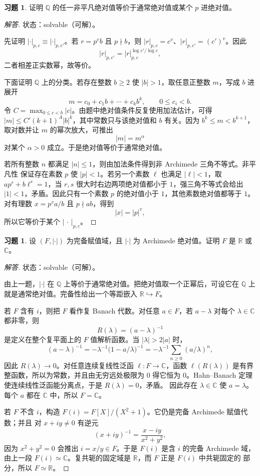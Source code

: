 \documentclass[11pt,a4paper,openany]{ctexbook}
\numberwithin{equation}{chapter}
\newcommand{\Q}{\mathbb{Q}}
\newcommand{\R}{\mathbb{R}}
\newcommand{\C}{\mathbb{C}}
\theoremstyle{plain}
\theoremstyle{definition}
\newtheorem{exercise}[theorem]{习题}
\theoremstyle{remark}
\begin{document}
\begin{exercise}
证明 $\Q$ 的任一非平凡绝对值等价于通常绝对值或某个 $p$ 进绝对值。
\end{exercise}

\begin{proof}[解答]
状态：solvable（可解）。

先证明 $|\cdot|_{p,c}\equiv|\cdot|_{p,c'}$。若 $r=p^vb$ 且 $p\nmid b$，则
$|r|_{p,c}=c^v$、$|r|_{p,c'}=(c')^v$。因此
\[
|r|_{p,c'}=|r|_{p,c}^{\log c'/\log c},
\]
二者相差正实数幂，故等价。

下面证明 $\Q$ 上的分类。若存在整数 $b\ge2$ 使 $|b|>1$，取任意正整数 $m$，写成
$b$ 进展开
\[
m=c_0+c_1b+\cdots+c_kb^k,\qquad 0\le c_i<b.
\]
令 $C=\max_{0\le c<b}|c|$。由题中绝对值条件反复使用加法估计，可得
$|m|\le C'(k+1)^A |b|^k$，其中常数只与该绝对值和 $b$ 有关。因为
$b^k\le m<b^{k+1}$，取对数并让 $m$ 的幂次放大，可推出
\[
|m|=m^\alpha
\]
对某个 $\alpha>0$ 成立。于是绝对值等价于通常绝对值。

若所有整数 $n$ 都满足 $|n|\le1$，则由加法条件得到非 Archimede 三角不等式。非平凡性
保证存在素数 $p$ 使 $|p|<1$。若另一个素数 $\ell$ 也满足 $|\ell|<1$，取
$ap^r+b\ell^s=1$，当 $r,s$ 很大时右边两项绝对值都小于 $1$，强三角不等式会给出
$|1|<1$，矛盾。因此只有一个素数 $p$ 的绝对值小于 $1$，其他素数绝对值都等于 $1$。
对有理数 $x=p^v a/b$ 且 $p\nmid ab$，得到
\[
|x|=|p|^v,
\]
所以它等价于某个 $|\,\cdot\,|_{p,c}$。
\end{proof}

\begin{exercise}
设 $(F,|\cdot|)$ 为完备赋值域，且 $|\cdot|$ 为 Archimede 绝对值。证明 $F$ 是 $\R$ 或 $\C$。
\end{exercise}

\begin{proof}[解答]
状态：solvable（可解）。

由上一题，$|\cdot|$ 在 $\Q$ 上等价于通常绝对值。把绝对值取一个正幂后，可设它在
$\Q$ 上就是通常绝对值。完备性给出一个等距嵌入 $\R\hookrightarrow F$。

若 $F$ 含有 $i$，则把 $F$ 看作复 Banach 代数。对任意 $a\in F$，若
$a-\lambda$ 对每个 $\lambda\in\C$ 都非零，则
\[
R(\lambda)=(a-\lambda)^{-1}
\]
是定义在整个复平面上的 $F$ 值解析函数。当 $|\lambda|>2|a|$ 时，
\[
(a-\lambda)^{-1}
=-\lambda^{-1}\bigl(1-a/\lambda\bigr)^{-1}
=-\lambda^{-1}\sum_{n\ge0}(a/\lambda)^n,
\]
因此 $R(\lambda)\to0$。对任意连续复线性泛函 $\ell:F\to\C$，函数
$\ell(R(\lambda))$ 是有界整函数，所以为常数，并且由无穷远处极限为 $0$ 得它恒为
$0$。Hahn--Banach 定理使连续线性泛函能分离点，于是 $R(\lambda)=0$，矛盾。
因此存在 $\lambda\in\C$ 使 $a=\lambda$。每个 $a$ 都在 $\C$ 中，所以 $F=\C$。

若 $F$ 不含 $i$，构造 $F(i)=F[X]/(X^2+1)$。它仍是完备 Archimede 赋值代数；并且
对 $x+iy\ne0$ 有逆元
\[
(x+iy)^{-1}=\frac{x-iy}{x^2+y^2},
\]
因为 $x^2+y^2=0$ 会推出 $i=x/y\in F$。于是 $F(i)$ 是含 $i$ 的完备 Archimede 域，
由上一段 $F(i)\simeq\C$。复共轭的固定域是 $\R$，而 $F$ 正是 $F(i)$ 中共轭固定的
部分，所以 $F\simeq\R$。
\end{proof}
\end{document}
